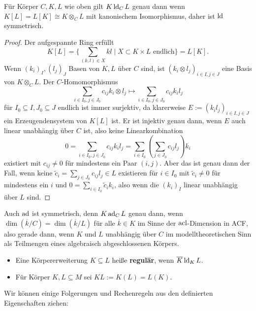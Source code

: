     \begin{lemma}\label{Tensoren}
    	Für Körper $C,K,L$ wie oben gilt $K\operatorname{ld}_CL$ genau dann wenn $K[L]=L[K]\cong K\otimes_CL$ mit kanonischem Isomorphismus, daher ist $\operatorname{ld}$ symmetrisch.
    \end{lemma}
    \begin{proof}
    	Der aufgespannte Ring erfüllt $$K[L]=\{\sum\limits_{(k,l)\in X}kl\mid X\subset K\times L\text{ endlich}\}=L[K].$$
    	Wenn $(k_i)_I,(l_j)_J$ Basen von $K,L$ über $C$ sind, ist $(k_i\otimes l_j)_{i\in I,j\in J}$ eine Basis von $K\otimes_CL$. Der $C$-Homomorphismus $$\sum\limits_{i\in I_0,j\in J_0} c_{ij}k_i\otimes l_j\mapsto \sum\limits_{i\in I_0,j\in J_0} c_{ij}k_il_j$$ für $I_0\subseteq I,J_0\subseteq J$ endlich ist immer surjektiv, da klarerweise $E:=(k_il_j)_{i\in I,j\in J}$ ein Erzeugendensystem von $K[L]$ ist. Er ist injektiv genau dann, wenn $E$ auch linear unabhängig über $C$ ist, also keine Linearkombination $$0=\sum\limits_{i\in I_0,j\in J_0}c_{ij}k_il_j=\sum\limits_{i\in I_0}(\sum\limits_{j\in J_0}c_{ij}l_j)k_i$$ existiert mit $c_{ij}\neq0$ für mindestens ein Paar $(i,j)$. Aber das ist genau dann der Fall, wenn keine $\tilde{c}_i=\sum\limits_{j\in J_0}c_{ij}l_j\in L$ existieren für $i\in I_0$ mit $\tilde{c}_i\neq0$ für mindestens ein $i$ und $0=\sum\limits_{i\in I_0}\tilde{c}_ik_i$, also wenn die $(k_i)_I$ linear unabhängig über $L$ sind.
    \end{proof}
    \begin{remark}
    	 Auch $\operatorname{ad}$ ist symmetrisch, denn $K\operatorname{ad}_CL$ genau dann, wenn $\dim(\overline{k}/C)=\dim(\overline{k}/L)$ für alle $\overline{k}\in K$ im Sinne der $\operatorname{acl}$-Dimension in ACF, also gerade dann, wenn $K$ und $L$ unabhängig über $C$ im modelltheoretischen Sinn als Teilmengen eines algebraisch abgeschlossenen Körpers.
    \end{remark}
    
    \begin{definition}
    	\begin{itemize}
    		\item Eine Körpererweiterung $K\subseteq L$ heiße \textbf{regulär}, wenn $\overline{K}\operatorname{ld}_KL$.
    		\item Für Körper $K,L\subseteq M$ sei $KL:=K(L)=L(K)$.
    	\end{itemize}
    \end{definition}
    
    Wir können einige Folgerungen und \glqq{}Rechenregeln\grqq{} aus den definierten Eigenschaften ziehen:
    
